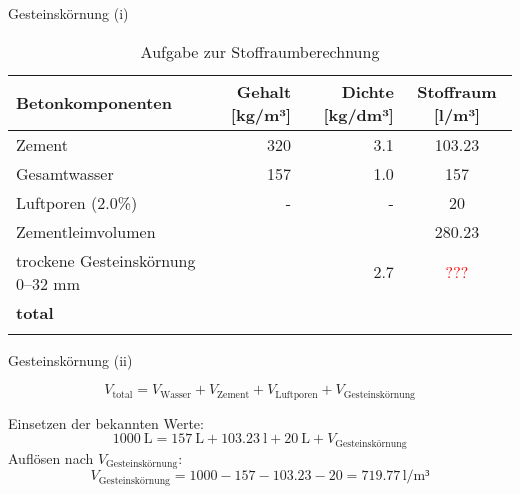 \begin{frame}{Gesteinskörnung (i)}
    \begin{table}[h]
        \centering
        \caption{Aufgabe zur Stoffraumberechnung}
        \small
        \begin{tabular}{lrrc}
        \toprule
        \textbf{Betonkomponenten}       & \textbf{Gehalt [kg/m³]} & \textbf{Dichte [kg/dm³]} & \textbf{Stoffraum [l/m³]} \\ 
        \midrule
        Zement                           & 320                      & 3.1                       &    103.23          \\
        Gesamtwasser                     & 157                      & 1.0                       &  157            \\
        Luftporen (2.0\%)                & -                        & -                         & 20              \\
        Zementleimvolumen                &                          &                           & 280.23                          \\
        trockene Gesteinskörnung 0–32 mm & {}                     & 2.7                       & \textcolor{red}{???}              \\
        \textbf{total}                   & {}         &                           & {}             \\
        \bottomrule
        \label{tab:Stoffraumberechnung}
        \end{tabular}
        \end{table}

\end{frame}


\begin{frame}{Gesteinskörnung (ii)}

    \begin{equation*}
        V_\text{total} = V_{\text{Wasser}} + V_{\text{Zement}} + V_{\text{Luftporen}} + V_{\text{Gesteinskörnung}}
    \end{equation*}

    \pause
    \vspace{1cm}
    Einsetzen der bekannten Werte:
    \begin{equation*}
        \SI{1000}{\liter} = \SI{157}{\liter} + \SI{103.23}{\l} + \SI{20}{\liter} + V_{\text{Gesteinskörnung}}
    \end{equation*}
    \pause
    \vspace{1cm}
    Auflösen nach $V_{\text{Gesteinskörnung}}$:
    \begin{equation*}
        V_{\text{Gesteinskörnung}} = 1000 - 157 - 103.23 - 20 = 719.77 \, \text{l/m³}
    \end{equation*}

\end{frame}

